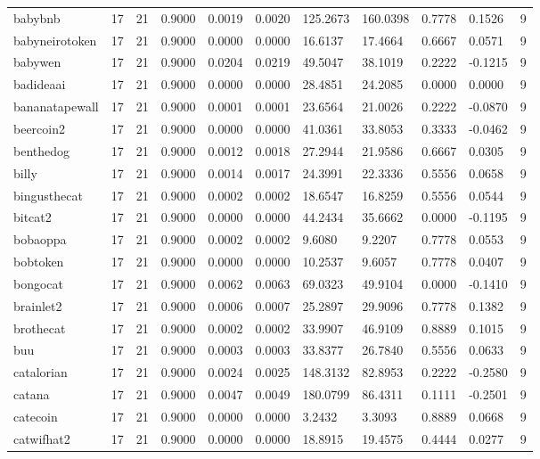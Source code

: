 \begin{table}[htbp]
\begin{tabular}{lllllllllll}
babybnb & 17 & 21 & 0.9000 & 0.0019 & 0.0020 & 125.2673 & 160.0398 & 0.7778 & 0.1526 & 9 \\
babyneirotoken & 17 & 21 & 0.9000 & 0.0000 & 0.0000 & 16.6137 & 17.4664 & 0.6667 & 0.0571 & 9 \\
babywen & 17 & 21 & 0.9000 & 0.0204 & 0.0219 & 49.5047 & 38.1019 & 0.2222 & -0.1215 & 9 \\
badideaai & 17 & 21 & 0.9000 & 0.0000 & 0.0000 & 28.4851 & 24.2085 & 0.0000 & 0.0000 & 9 \\
bananatapewall & 17 & 21 & 0.9000 & 0.0001 & 0.0001 & 23.6564 & 21.0026 & 0.2222 & -0.0870 & 9 \\
beercoin2 & 17 & 21 & 0.9000 & 0.0000 & 0.0000 & 41.0361 & 33.8053 & 0.3333 & -0.0462 & 9 \\
benthedog & 17 & 21 & 0.9000 & 0.0012 & 0.0018 & 27.2944 & 21.9586 & 0.6667 & 0.0305 & 9 \\
billy & 17 & 21 & 0.9000 & 0.0014 & 0.0017 & 24.3991 & 22.3336 & 0.5556 & 0.0658 & 9 \\
bingusthecat & 17 & 21 & 0.9000 & 0.0002 & 0.0002 & 18.6547 & 16.8259 & 0.5556 & 0.0544 & 9 \\
bitcat2 & 17 & 21 & 0.9000 & 0.0000 & 0.0000 & 44.2434 & 35.6662 & 0.0000 & -0.1195 & 9 \\
bobaoppa & 17 & 21 & 0.9000 & 0.0002 & 0.0002 & 9.6080 & 9.2207 & 0.7778 & 0.0553 & 9 \\
bobtoken & 17 & 21 & 0.9000 & 0.0000 & 0.0000 & 10.2537 & 9.6057 & 0.7778 & 0.0407 & 9 \\
bongocat & 17 & 21 & 0.9000 & 0.0062 & 0.0063 & 69.0323 & 49.9104 & 0.0000 & -0.1410 & 9 \\
brainlet2 & 17 & 21 & 0.9000 & 0.0006 & 0.0007 & 25.2897 & 29.9096 & 0.7778 & 0.1382 & 9 \\
brothecat & 17 & 21 & 0.9000 & 0.0002 & 0.0002 & 33.9907 & 46.9109 & 0.8889 & 0.1015 & 9 \\
buu & 17 & 21 & 0.9000 & 0.0003 & 0.0003 & 33.8377 & 26.7840 & 0.5556 & 0.0633 & 9 \\
catalorian & 17 & 21 & 0.9000 & 0.0024 & 0.0025 & 148.3132 & 82.8953 & 0.2222 & -0.2580 & 9 \\
catana & 17 & 21 & 0.9000 & 0.0047 & 0.0049 & 180.0799 & 86.4311 & 0.1111 & -0.2501 & 9 \\
catecoin & 17 & 21 & 0.9000 & 0.0000 & 0.0000 & 3.2432 & 3.3093 & 0.8889 & 0.0668 & 9 \\
catwifhat2 & 17 & 21 & 0.9000 & 0.0000 & 0.0000 & 18.8915 & 19.4575 & 0.4444 & 0.0277 & 9 \\

\end{tabular}
\end{table}
